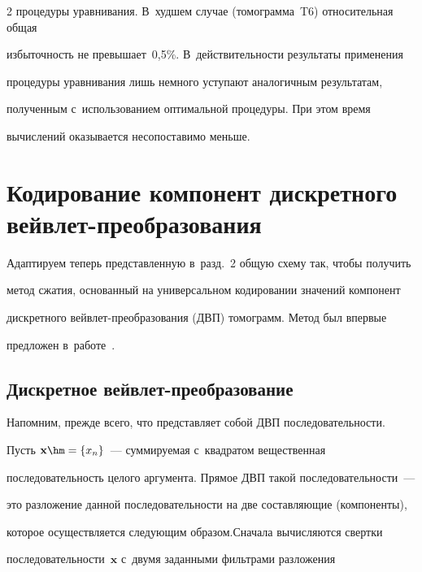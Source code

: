 \begin{multicols}{2}
процедуры уравнивания. В~худшем случае (томограмма~T6) относительная общая 

избыточность не превышает~0,5\%. В~действительности результаты применения 

процедуры уравнивания лишь немного уступают аналогичным результатам, 

полученным с~использованием оптимальной процедуры. При этом время 

вычислений оказывается несопоставимо меньше.



\vspace*{-6pt}





\section{Кодирование компонент дискретного вейвлет-преобразования}



Адаптируем теперь представленную в~разд.~2 общую схему так, чтобы получить 

метод сжатия, основанный на универсальном кодировании значений компонент 

дискретного вейв\-лет-пре\-об\-ра\-зо\-ва\-ния (ДВП) томограмм. Метод был впервые 

предложен в~работе~\cite{b05}.



\vspace*{-6pt}



\subsection{Дискретное вейвлет-преобразование}



Напомним, прежде всего, что представляет собой ДВП последовательности. 

Пусть $\mathbf{x}\hm=\{x_n\}$~--- суммируемая с~квадратом вещественная 

последовательность целого аргумента. Прямое ДВП \mbox{такой} последовательности~--- 

это разложение данной последовательности на две составляющие (компоненты), 

которое осуществляется следующим образом.\linebreak Сначала вычисляются свертки 

последователь\-ности~$\mathbf {x}$  с~двумя заданными фильтрами разложения 


\end{multicols}
